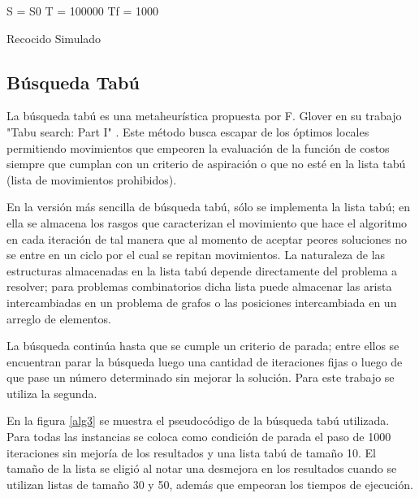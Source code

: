 \documentclass{ci5652}
\begin{document}
\begin{algorithm}
 \label{alg2}
 \DontPrintSemicolon
 \vspace*{0.1cm}
 S = S0 
 T = 100000 
 Tf = 1000 
 \vspace*{0.1cm}
 \caption{Recocido Simulado}
\end{algorithm}

\subsection{Búsqueda Tabú}

La búsqueda tabú es una metaheurística propuesta por F. Glover en su trabajo "Tabu search: Part I" \cite{8}. Este método busca escapar de los óptimos locales permitiendo movimientos que empeoren la evaluación de la función de costos siempre que cumplan con un criterio de aspiración o que no esté en la lista tabú (lista de movimientos prohibidos). 

En la versión más sencilla de búsqueda tabú, sólo se implementa la lista tabú; en ella se almacena los rasgos que caracterizan el movimiento que hace el algoritmo en cada iteración de tal manera que al momento de aceptar peores soluciones no se entre en un ciclo por el cual se repitan movimientos. La naturaleza de las estructuras almacenadas en la lista tabú depende directamente del problema a resolver; para problemas combinatorios dicha lista puede almacenar las arista intercambiadas en un problema de grafos o las posiciones intercambiada en un arreglo de elementos.

La búsqueda continúa hasta que se cumple un criterio de parada; entre ellos se encuentran parar la búsqueda luego una cantidad de iteraciones fijas o luego de que pase un número determinado sin mejorar la solución. Para este trabajo se utiliza la segunda.

En la figura \ref{alg3} se muestra el pseudocódigo de la búsqueda tabú utilizada. Para todas las instancias se coloca como condición de parada el paso de 1000 iteraciones sin mejoría de los resultados y una lista tabú de tamaño 10. El tamaño de la lista se eligió al notar una desmejora en los resultados cuando se utilizan listas de tamaño 30 y 50, además que empeoran los tiempos de ejecución.
\end{document}
